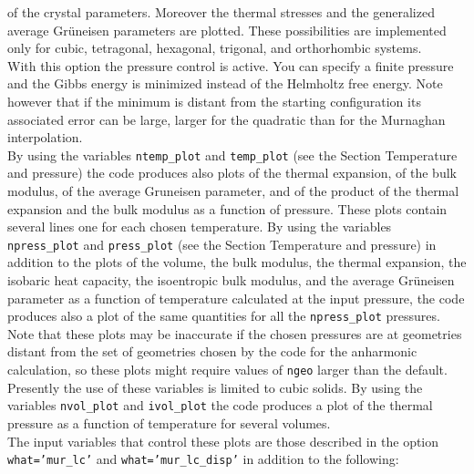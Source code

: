 \documentclass[12pt,a4paper,twoside]{report}
\begin{document}
of the crystal parameters.
Moreover the thermal stresses and the generalized average Gr\"uneisen
parameters are plotted.
These possibilities are implemented only for cubic, tetragonal, 
hexagonal, trigonal, and orthorhombic systems. \\
With this option the pressure control is active. You can specify a
finite pressure and the Gibbs energy is minimized instead of the
Helmholtz free energy. Note however that if the minimum is distant from 
the starting configuration its associated error can be large, larger for the
quadratic than for the Murnaghan interpolation. \\
By using the variables \texttt{ntemp\_plot} and \texttt{temp\_plot} (see
the Section Temperature and pressure) the code produces also plots
of the thermal expansion, of the bulk modulus, of the average 
Gruneisen parameter, and of the product of the thermal expansion
and the bulk modulus as a function of pressure. These plots contain
several lines one for each chosen temperature.
By using the variables \texttt{npress\_plot} and \texttt{press\_plot} (see
the Section Temperature and pressure) in addition to the plots of
the volume, the bulk modulus, the thermal expansion, the 
isobaric heat capacity, 
the isoentropic bulk modulus, and the average Gr\"uneisen parameter 
as a function of temperature calculated at the input pressure, the code
produces also a plot of the same quantities for all the \texttt{npress\_plot}
pressures. Note that these plots may be inaccurate if the chosen
pressures are at geometries distant from the set of geometries chosen
by the code for the anharmonic calculation, so these plots might
require values of \texttt{ngeo} larger than the default. Presently the
use of these variables is limited to cubic solids.
By using the variables \texttt{nvol\_plot} and \texttt{ivol\_plot} the
code produces a plot of the thermal pressure as a function of temperature
for several volumes. \\
The input variables that control these plots are those described in the option
\texttt{what='mur\_lc'} and \texttt{what='mur\_lc\_disp'} in addition to the 
following:
\end{document}
